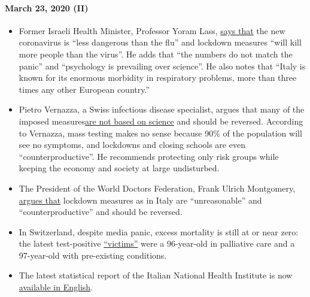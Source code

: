 \hypertarget{march-23-2020-ii}{%
\paragraph{March 23, 2020 (II)}\label{march-23-2020-ii}}

\begin{itemize}
\tightlist
\item
  Former Israeli Health Minister, Professor Yoram Lass,
  \href{https://en.globes.co.il/en/article-lockdown-lunacy-1001322696}{says
  that} the new coronavirus is ``less dangerous than the flu'' and
  lockdown measures ``will kill more people than the virus''. He adds
  that ``the numbers do not match the panic'' and ``psychology is
  prevailing over science''. He also notes that ``Italy is known for its
  enormous morbidity in respiratory problems, more than three times any
  other European country.''
\item
  Pietro Vernazza, a Swiss infectious disease specialist, argues that
  many of the imposed
  measures\href{https://www.tagblatt.ch/leben/ostschweizer-infektiologe-pietro-vernazza-die-zahlen-zu-den-jungen-corona-virus-erkrankten-sind-irrefuehrend-ld.1206440}{are
  not based on science} and should be reversed. According to Vernazza,
  mass testing makes no sense because 90\% of the population will see no
  symptoms, and lockdowns and closing schools are even
  ``counterproductive''. He recommends protecting only risk groups while
  keeping the economy and society at large undisturbed.
\item
  The President of the World Doctors Federation, Frank Ulrich
  Montgomery,
  \href{https://www.general-anzeiger-bonn.de/news/politik/deutschland/interview-mit-weltaerztepraesident-montgomery-ueber-corona-pandemie-ist-chaos_aid-49609561}{argues
  that} lockdown measures as in Italy are ``unreasonable'' and
  ``counterproductive'' and should be reversed.
\item
  In Switzerland, despite media panic, excess mortality is still at or
  near zero: the latest test-positive
  \href{https://www.bluewin.ch/de/newsregional/zuerich/1068-bestatigte-corona-falle-und-funf-todesfalle-im-kanton-zurich-371873.html}{``victims''}
  were a 96-year-old in palliative care and a 97-year-old with
  pre-existing conditions.
\item
  The latest statistical report of the Italian National Health Institute
  is now
  \href{https://www.epicentro.iss.it/coronavirus/bollettino/Report-COVID-2019_20_marzo_eng.pdf}{available
  in English}.
\end{itemize}

